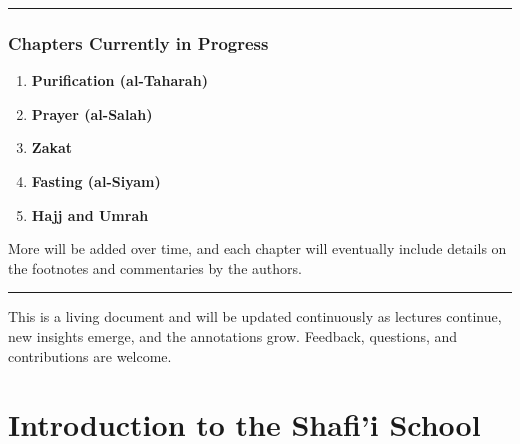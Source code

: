 \documentclass[
  a4paper,
  DIV=11,
  numbers=noendperiod]{scrartcl}
\providecommand{\tightlist}{%
  \setlength{\itemsep}{0pt}\setlength{\parskip}{0pt}}
\begin{document}
\begin{center}\rule{0.5\linewidth}{0.5pt}\end{center}

\subsubsection{Chapters Currently in
Progress}\label{chapters-currently-in-progress}

\begin{enumerate}
\def\labelenumi{\arabic{enumi}.}
\tightlist
\item
  \textbf{Purification (al-Taharah)}\\
\item
  \textbf{Prayer (al-Salah)}\\
\item
  \textbf{Zakat}\\
\item
  \textbf{Fasting (al-Siyam)}\\
\item
  \textbf{Hajj and Umrah}
\end{enumerate}

More will be added over time, and each chapter will eventually include
details on the footnotes and commentaries by the authors.

\begin{center}\rule{0.5\linewidth}{0.5pt}\end{center}

\begin{tcolorbox}[enhanced jigsaw, colframe=quarto-callout-important-color-frame, breakable, toptitle=1mm, coltitle=black, opacityback=0, bottomrule=.15mm, left=2mm, bottomtitle=1mm, title=\textcolor{quarto-callout-important-color}{\faExclamation}\hspace{0.5em}{Note}, rightrule=.15mm, opacitybacktitle=0.6, colback=white, colbacktitle=quarto-callout-important-color!10!white, arc=.35mm, toprule=.15mm, titlerule=0mm, leftrule=.75mm]

This is a living document and will be updated continuously as lectures
continue, new insights emerge, and the annotations grow. Feedback,
questions, and contributions are welcome.

\end{tcolorbox}

\section{Introduction to the Shafi'i
School}\label{introduction-to-the-shafii-school}
\end{document}
